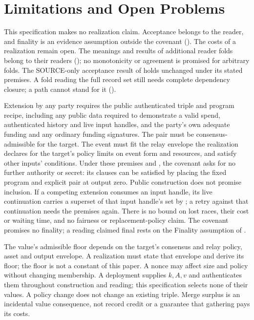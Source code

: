 \documentclass[../main.tex]{subfiles}
\begin{document}
\section{Limitations and Open Problems}
\label{sec:kpcfixed:limitations}
This specification makes no realization claim. Acceptance belongs to the
reader, and finality is an evidence assumption outside the covenant
(). The costs of a realization remain open.
The meanings and results of additional reader folds belong to their
readers (); no monotonicity or
agreement is promised for arbitrary folds. The SOURCE-only acceptance
result of  holds unchanged
under its stated premises. A fold reading the full record set still needs complete dependency
closure; a path cannot stand for it
().

\begin{remark}
\label{rem:kpcfixed:public-extension}
Extension by any party requires the public authenticated triple and
program recipe, including any public data required to demonstrate a valid
spend, authenticated history and live input handles, and the party's own
adequate funding and any ordinary funding signatures. The pair must be
consensus-admissible for the target. The event must fit the relay envelope
the realization declares for the target's policy limits on event form and
resources, and satisfy other inputs' conditions. Under these premises and
, the covenant asks for no further
authority or secret: its clauses can be satisfied by placing the fixed
program and explicit pair at output zero. Public construction does not
promise inclusion. If a competing extension consumes an input handle, its
live continuation carries a superset of that input handle's set by
; a retry against that
continuation needs the premises again. There is no bound on lost races,
their cost or waiting time, and no fairness or replacement-policy claim.
The covenant promises no finality; a reading claimed final rests on the
Finality assumption of .
\end{remark}

\begin{remark}
\label{rem:kpcfixed:policy-floor}
The value's admissible floor depends on the target's consensus and relay
policy, asset and output envelope. A realization must state that envelope
and derive its floor; the floor is not a constant of this paper. A nonce
may affect size and policy without changing membership. A deployment
supplies $k,A,v$ and authenticates them throughout construction and
reading; this specification selects none of their values. A policy change
does not change an existing triple. Merge surplus is an incidental value
consequence, not record credit or a guarantee that gathering pays its costs.
\end{remark}
\end{document}
